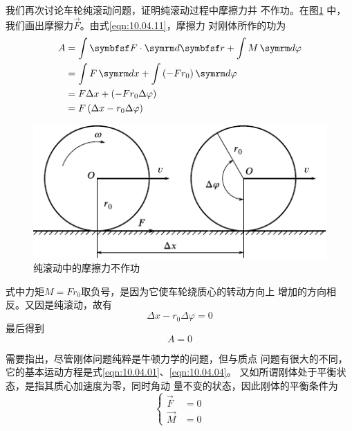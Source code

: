 我们再次讨论车轮纯滚动问题，证明纯滚动过程中摩擦力并
不作功。在图\ref{fig:10.13} 中，我们画出摩擦力$\vec{F}$。由式\eqref{eqn:10.04.11}，摩擦力
对刚体所作的功为
\begin{equation*}
    \begin{split}
        A &= \int \vec{ F } \cdot  \dif \vec{r} + \int M  \dif \varphi \\
      &= \int F  \dif x + \int \left( - F r _ { 0 } \right)  \dif \varphi \\
      &= F \Delta x + \left( - F r _ { 0 } \Delta \varphi \right) \\%
      &= F \left( \Delta x - r _ { 0 } \Delta \varphi \right)
    \end{split}
\end{equation*}

\clearpage
\begin{figure}[h]
    \centering
    \includegraphics{figure/fig10.13}
    \caption{纯滚动中的摩擦力不作功}
    \label{fig:10.13}
\end{figure}
式中力矩$  M = F r _ { 0 }   $取负号，是因为它使车轮绕质心的转动方向上
增加的方向相反。又因是纯滚动，故有
\begin{equation*}
    \Delta x - r _ { 0 } \Delta \varphi = 0
\end{equation*}
最后得到
\begin{equation*}
    A = 0
\end{equation*}

需要指出，尽管刚体问题纯粹是牛顿力学的问题，但与质点
问题有很大的不同，它的基本运动方程是式\eqref{eqn:10.04.01}、\eqref{eqn:10.04.04}。
又如所谓刚体处于平衡状态，是指其质心加速度为零，同时角动
量不变的状态，因此刚体的平衡条件为
\begin{equation}\label{eqn:10.04.12}
    \begin{cases}
        \vec{ F } &= 0 \\
        \vec{ M } &= 0
    \end{cases}
\end{equation}

